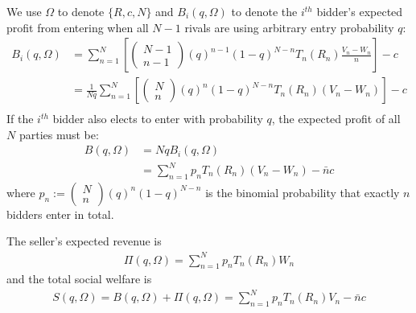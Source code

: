 \documentclass[11pt]{elegantbook_2}
\begin{document}
We use $\Omega$ to denote $\{R,c,N\}$ and $B_i(q,\Omega)$ to denote the $i^{th}$ bidder's expected profit from entering when all $N-1$ rivals are using arbitrary entry probability $q$:
\begin{equation}
    \begin{aligned}
        B_i(q,\Omega)&=\sum_{n=1}^N\left[
            \begin{pmatrix}
            N-1\\
            n-1
        \end{pmatrix}
        (q)^{n-1}(1-q)^{N-n}T_n(R_n)\frac{V_n-W_n}{n}
        \right]-c\\
        &=\frac{1}{Nq}\sum_{n=1}^N\left[
            \begin{pmatrix}
            N\\
            n
        \end{pmatrix}
        (q)^{n}(1-q)^{N-n}T_n(R_n)\left(V_n-W_n\right)
        \right]-c\\
    \end{aligned}
    \nonumber
\end{equation}
If the $i^{th}$ bidder also elects to enter with probability $q$, the expected profit of all $N$ parties must be:
\begin{equation}
    \begin{aligned}
        B(q,\Omega)&=NqB_i(q,\Omega)\\
        &=\sum_{n=1}^N p_n T_n(R_n)(V_n-W_n)-\bar{n}c
    \end{aligned}
    \nonumber
\end{equation}
where $p_n:=\begin{pmatrix}N\\n\end{pmatrix}(q)^{n}(1-q)^{N-n}$ is the binomial probability that exactly $n$ bidders enter in total.

The seller's expected revenue is
\begin{equation}
    \begin{aligned}
        \Pi(q,\Omega)=\sum_{n=1}^N p_n T_n(R_n)W_n
    \end{aligned}
    \nonumber
\end{equation}
and the total social welfare is
\begin{equation}
    \begin{aligned}
        S(q,\Omega)=B(q,\Omega)+\Pi(q,\Omega)=\sum_{n=1}^N p_n T_n(R_n)V_n-\bar{n}c
    \end{aligned}
    \nonumber
\end{equation}
\end{document}
